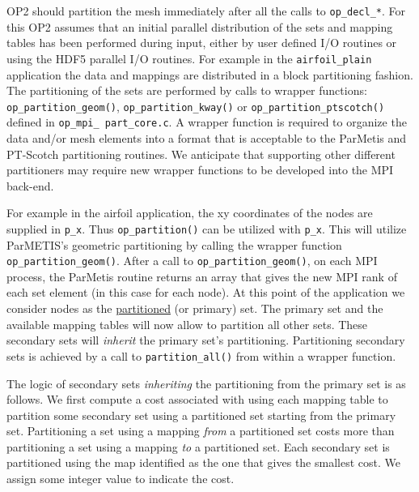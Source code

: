 \documentclass[11pt]{article}
\begin{document}
\indent OP2 should partition the mesh immediately after all the calls to \texttt{op\_decl\_*}. For this OP2 assumes
that an initial parallel distribution of the sets and mapping tables has been performed during input, either by user
defined I/O routines or using the HDF5 parallel I/O routines. For example in the \texttt{airfoil\_plain} application the
data and mappings are distributed in a block partitioning fashion. The partitioning of the sets are performed by calls
to wrapper functions: \texttt{op\_partition\_geom()}, \texttt{op\_partition\_kway()} or
\texttt{op\_partition\_ptscotch()} defined in \texttt{op\_mpi\_ part\_core.c}. A wrapper function is required to
organize the data and/or mesh elements into a format that is acceptable to the ParMetis and PT-Scotch partitioning
routines. We anticipate that supporting other different partitioners may require new wrapper functions to be developed
into the MPI back-end.


\indent For example in the airfoil application, the xy coordinates of the nodes are supplied in \texttt{p\_x}. Thus
\texttt{op\_partition()} can be utilized with \texttt{p\_x}. This will utilize ParMETIS's geometric partitioning by
calling the wrapper function \texttt{op\_partition\_geom()}. After a call to \texttt{op\_partition\_geom()}, on
each MPI process, the ParMetis routine returns an array that gives the new MPI rank of each set element (in this case
for each node). At this point of the application we consider nodes as the \underline{partitioned} (or primary) set. The
primary set and the available mapping tables will now allow to partition all other sets. These secondary sets will
\textit{inherit} the primary set's partitioning. Partitioning secondary sets is achieved by a call to
\texttt{partition\_all()} from within a wrapper function.

The logic of secondary sets \textit{inheriting} the partitioning from the primary set is as follows. We first compute a
cost associated with using each mapping table to partition some secondary set using a partitioned set starting from
the primary set. Partitioning a set using a mapping \textit{from} a partitioned set costs more than partitioning a set
using a mapping \textit{to} a partitioned set. Each secondary set is partitioned using the map identified as the one
that gives the smallest cost. We assign some integer value to indicate the cost.
\end{document}
